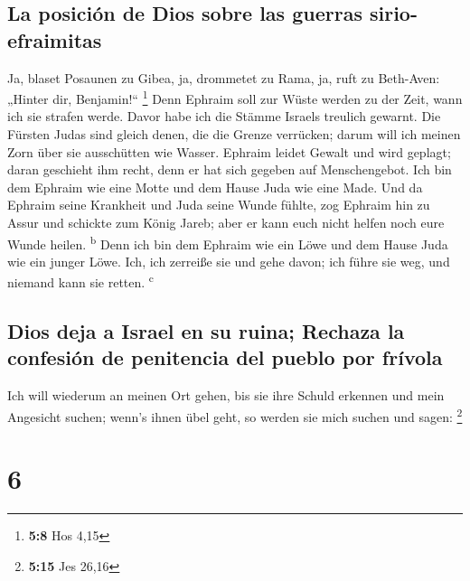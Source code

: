 \hypertarget{la-posiciuxf3n-de-dios-sobre-las-guerras-sirio-efraimitas}{%
\subsection{La posición de Dios sobre las guerras
sirio-efraimitas}\label{la-posiciuxf3n-de-dios-sobre-las-guerras-sirio-efraimitas}}

 Ja, blaset Posaunen zu Gibea, ja, drommetet zu Rama, ja,
ruft zu Beth-Aven: „Hinter dir, Benjamin!{}`` \footnote{\textbf{5:8} Hos
  4,15}  Denn Ephraim soll zur Wüste werden zu der Zeit,
wann ich sie strafen werde. Davor habe ich die Stämme Israels treulich
gewarnt.  Die Fürsten Judas sind gleich denen, die die
Grenze verrücken; darum will ich meinen Zorn über sie ausschütten wie
Wasser.  Ephraim leidet Gewalt und wird geplagt; daran
geschieht ihm recht, denn er hat sich gegeben auf Menschengebot.
 Ich bin dem Ephraim wie eine Motte und dem Hause Juda
wie eine Made.  Und da Ephraim seine Krankheit und Juda
seine Wunde fühlte, zog Ephraim hin zu Assur und schickte zum König
Jareb; aber er kann euch nicht helfen noch eure Wunde heilen.
\textsuperscript{b}  Denn ich bin dem Ephraim wie ein
Löwe und dem Hause Juda wie ein junger Löwe. Ich, ich zerreiße sie und
gehe davon; ich führe sie weg, und niemand kann sie retten.
\textsuperscript{c}

\hypertarget{dios-deja-a-israel-en-su-ruina-rechaza-la-confesiuxf3n-de-penitencia-del-pueblo-por-fruxedvola}{%
\subsection{Dios deja a Israel en su ruina; Rechaza la confesión de
penitencia del pueblo por
frívola}\label{dios-deja-a-israel-en-su-ruina-rechaza-la-confesiuxf3n-de-penitencia-del-pueblo-por-fruxedvola}}

 Ich will wiederum an meinen Ort gehen, bis sie ihre
Schuld erkennen und mein Angesicht suchen; wenn's ihnen übel geht, so
werden sie mich suchen und sagen: \footnote{\textbf{5:15} Jes 26,16}

\hypertarget{section-5}{%
\section{6}\label{section-5}}

